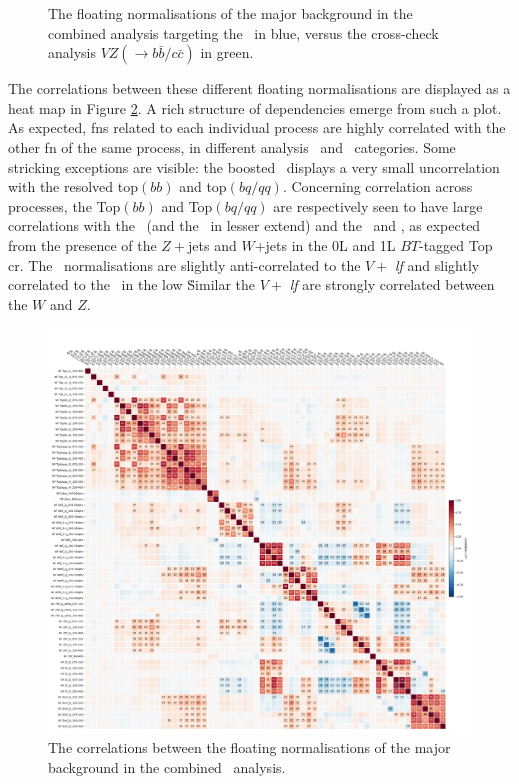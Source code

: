 \begin{figure}[h!]
    \caption{The floating normalisations of the major background in the combined analysis targeting the \vhbc\ in blue, versus the cross-check analysis $VZ(\rightarrow b\bar{b}/c\bar{c})$ in green.}
    \label{fig:FNback}
\end{figure} 

The correlations between these different floating normalisations are displayed as a heat map in Figure \ref{fig:FNcorr}. A rich structure of dependencies emerge from such a plot. As expected, \gls{fn}s related to each individual process are highly correlated with the other \gls{fn} of the same process, in different analysis \ptv\ and \nj\ categories. Some stricking exceptions are visible: the boosted \ttb\ displays a very small uncorrelation with the resolved top$(bb)$ and top$(bq/qq)$. Concerning correlation across processes, the Top$(bb)$ and Top$(bq/qq)$ are respectively seen to have large correlations with the \zhf\ (and the \whf\ in lesser extend) and the \wmf\ and \zhf, as expected from the presence of the $Z+$jets and $W$+jets in the 0L and 1L $BT$-tagged Top \gls{cr}. The \whf\ normalisations are slightly anti-correlated to the $V+$ \textit{lf} and slightly correlated to the \zhf\ in the low \nj\. Similar the $V+$ \textit{lf} are strongly correlated between the $W$ and $Z$.
  
\begin{figure}[h!]
    \centering
    \hspace{-1cm}
    \includegraphics[width=1.1\textwidth]{Images/VH/Fit/fromSlides/SMVHbbcc_2022_MVA_mc16ade_v14.fit_012_fullRes_VHbb_fit_012_012_mc16ade_Systs_mva_VHbbcc_AsimovFit_conditional_mu1_Cov_BTag}
    \caption{The correlations between the floating normalisations of the major background in the combined \vhbc\ analysis.}
    \label{fig:FNcorr}
\end{figure} 

